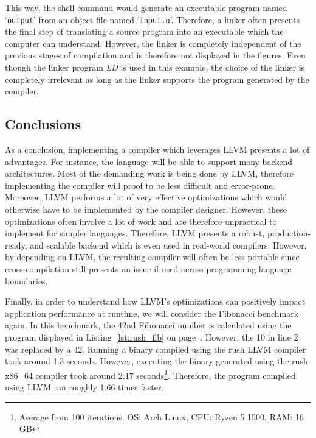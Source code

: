 This way, the shell command would generate an executable program named `\texttt{output}' from an object file named `\texttt{input.o}'.
Therefore, a linker often presents the final step of translating a source program into an executable which the computer can understand.
However, the linker is completely independent of the previous stages of compilation and is therefore not displayed in the figures.
Even though the linker program \emph{LD} is used in this example, the choice of the linker is completely irrelevant as long as the linker supports the program generated by the compiler.

\subsection{Conclusions}

As a conclusion, implementing a compiler which leverages LLVM presents a lot of advantages.
For instance, the language will be able to support many backend architectures.
Most of the demanding work is being done by LLVM, therefore implementing the compiler will proof to be less difficult and error-prone.
Moreover, LLVM performs a lot of very effective optimizations which would otherwise have to be implemented by the compiler designer.
However, these optimizations often involve a lot of work and are therefore unpractical to implement for simpler languages.
Therefore, LLVM presents a robust, production-ready, and scalable backend which is even used in real-world compilers.
However, by depending on LLVM, the resulting compiler will often be less portable since cross-compilation still presents an issue if used across programming language boundaries.

Finally, in order to understand how LLVM's optimizations can positively impact application performance at runtime, we will consider the Fibonacci benchmark again.
In this benchmark, the 42nd Fibonacci number is calculated using the program displayed in Listing~\ref{lst:rush_fib} on page~\pageref{lst:rush_fib}.
However, the 10 in line 2 was replaced by a 42.
Running a binary compiled using the rush LLVM compiler took around 1.3 seconds.
However, executing the binary generated using the rush x86\_64 compiler took around 2.17 seconds\footnote{Average from 100 iterations. OS: Arch Linux, CPU: Ryzen 5 1500, RAM: 16 GB}.
Therefore, the program compiled using LLVM ran roughly 1.66 times faster.
